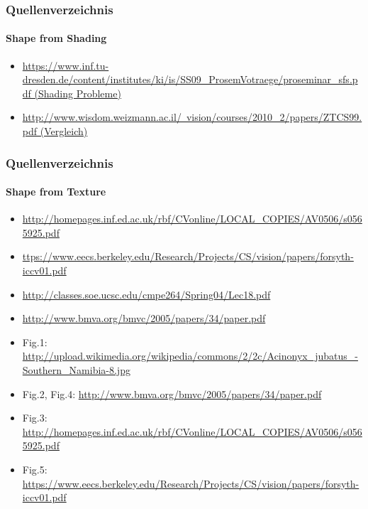 \documentclass{beamer}
\begin{document}
\begin{frame}
	\frametitle{Quellenverzeichnis}
	\framesubtitle{Shape from Shading}
	
	\begin{tiny}
		\begin{itemize}
			\item \href{https://www.inf.tu-dresden.de/content/institutes/ki/is/SS09_ProsemVotraege/proseminar_sfs.pdf}{https://www.inf.tu-dresden.de/content/institutes/ki/is/SS09\_ProsemVotraege/proseminar\_sfs.pdf (Shading Probleme)}
			\item \href{http://www.wisdom.weizmann.ac.il/~vision/courses/2010_2/papers/ZTCS99.pdf}{http://www.wisdom.weizmann.ac.il/~vision/courses/2010\_2/papers/ZTCS99.pdf (Vergleich)}
		\end{itemize}
	\end{tiny}
\end{frame}


\begin{frame}
	\frametitle{Quellenverzeichnis}
	\framesubtitle{Shape from Texture}
	
	\begin{tiny}
	\begin{itemize}
	\item \href{http://homepages.inf.ed.ac.uk/rbf/CVonline/LOCAL_COPIES/AV0506/s0565925.pdf}{http://homepages.inf.ed.ac.uk/rbf/CVonline/LOCAL\_COPIES/AV0506/s0565925.pdf}
	\item \href{https://www.eecs.berkeley.edu/Research/Projects/CS/vision/papers/forsyth-iccv01.pdf}{ttps://www.eecs.berkeley.edu/Research/Projects/CS/vision/papers/forsyth-iccv01.pdf}
	\item \href{http://classes.soe.ucsc.edu/cmpe264/Spring04/Lec18.pdf}{http://classes.soe.ucsc.edu/cmpe264/Spring04/Lec18.pdf}
	\item \href{http://www.bmva.org/bmvc/2005/papers/34/paper.pdf}{http://www.bmva.org/bmvc/2005/papers/34/paper.pdf}
	\end{itemize}
	\begin{itemize}
	\item Fig.1: \href{http://upload.wikimedia.org/wikipedia/commons/2/2c/Acinonyx_jubatus_-Southern_Namibia-8.jpg}{http://upload.wikimedia.org/wikipedia/commons/2/2c/Acinonyx\_jubatus\_-Southern\_Namibia-8.jpg}
	\item Fig.2, Fig.4: \href{http://www.bmva.org/bmvc/2005/papers/34/paper.pdf}{http://www.bmva.org/bmvc/2005/papers/34/paper.pdf}
	\item Fig.3: \href{http://homepages.inf.ed.ac.uk/rbf/CVonline/LOCAL_COPIES/AV0506/s0565925.pdf}{http://homepages.inf.ed.ac.uk/rbf/CVonline/LOCAL\_COPIES/AV0506/s0565925.pdf}
	\item Fig.5: \href{https://www.eecs.berkeley.edu/Research/Projects/CS/vision/papers/forsyth-iccv01.pdf}{https://www.eecs.berkeley.edu/Research/Projects/CS/vision/papers/forsyth-iccv01.pdf}
	\end{itemize}
	\end{tiny}
\end{frame}
\end{document}
